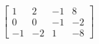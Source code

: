\documentclass[preview]{standalone}
\begin{document}
\begin{align*}
\left[\begin{array}{ccc|c} 1 & 2 & -1 & 8 \\ 0 & 0 & -1 & -2 \\ -1 & -2 & 1 & -8 \end{array}\right]
\end{align*}
\end{document}
